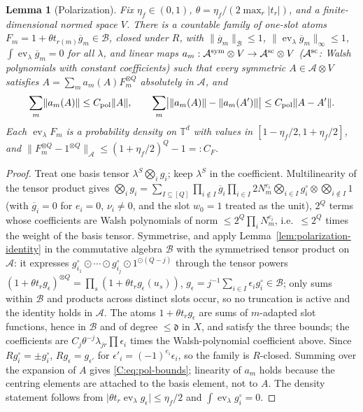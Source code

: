 \documentclass[11pt]{article}
\newtheorem{lemma}[lemma]{Lemma}
\DeclareMathOperator{\ev}{ev}
\newcommand{\Torus}{\mathbb{T}}
\newcommand{\cA}{\mathcal{A}}
\newcommand{\cB}{\mathcal{B}}
\newcommand{\norm}[1]{\lVert #1\rVert}
\newcommand{\abs}[1]{\lvert #1\rvert}
\newcommand{\dg}{\mathfrak{d}}
\begin{document}
\begin{lemma}[Polarization]\label{C:lem:pol}
Fix \(\eta_f\in(0,1)\), \(\theta=\eta_f/(2\max_r\abs{t_r})\), and a
finite-dimensional normed space \(V\).  There is a countable family of
one-slot atoms \(F_m=1+\theta t_{r(m)}\overline g_m\in\cB\), closed under
\(R\), with \(\norm{\overline g_m}_\cB\le1\), \(\norm{\ev_\lambda\overline g_m}_\infty\le1\),
\(\int\ev_\lambda\overline g_m=0\) for all \(\lambda\), and linear maps
\(a_m:\cA^{\rm sym}\otimes V\to\cA^{\rm sc}\otimes V\) (\(\cA^{\rm sc}\): Walsh
polynomials with constant coefficients) such that every symmetric
\(A\in\cA\otimes V\) satisfies \(A=\sum_ma_m(A)F_m^{\otimes Q}\) absolutely in
\(\cA\), and
\begin{equation}
 \sum_m\norm{a_m(A)}\le C_{\rm pol}\norm A,\qquad
 \sum_m\bigl|\norm{a_m(A)}-\norm{a_m(A')}\bigr|\le C_{\rm pol}\norm{A-A'} .
 \label{C:eq:pol-bounds}
\end{equation}
Each \(\ev_\lambda F_m\) is a probability density on \(\Torus^d\) with
values in \([1-\eta_f/2,1+\eta_f/2]\), and
\(\norm{F_m^{\otimes Q}-1^{\otimes Q}}_\cA\le(1+\eta_f/2)^Q-1=:C_F\).
\end{lemma}
\begin{proof}
Treat one basis tensor \(\lambda^S\bigotimes_ig_i\); keep \(\lambda^S\) in
the coefficient.  Multilinearity of the tensor product gives
\(\bigotimes_ig_i=\sum_{I\subseteq[Q]}\prod_{i\notin I}\overline g_i\prod_{i\in I}2N_m^{e_i}
\bigotimes_{i\in I}g^\circ_i\otimes\bigotimes_{i\notin I}1\) (with
\(\overline g_i=0\) for \(e_i=0\), \(\nu_i\ne0\), and the slot \(w_0=1\)
treated as the unit), \(2^Q\) terms whose coefficients are Walsh
polynomials of norm \(\le2^Q\prod_iN_m^{e_i}\), i.e.\ \(\le2^Q\) times the
weight of the basis tensor.  Symmetrise, and apply
Lemma~\ref{lem:polarization-identity} in the commutative algebra \(\cB\) with the
symmetrised tensor product on \(\cA\): it expresses
\(g^\circ_{i_1}\odot\cdots\odot g^\circ_{i_j}\odot1^{\odot(Q-j)}\) through the
tensor powers \((1+\theta t_rg_\epsilon)^{\otimes Q}=\prod_s(1+\theta t_rg_\epsilon(u_s))\),
\(g_\epsilon=j^{-1}\sum_{i\in I}\epsilon_ig^\circ_i\in\cB\); only sums within
\(\cB\) and products across distinct slots occur, so no truncation is
active and the identity holds in \(\cA\).  The atoms \(1+\theta t_rg_\epsilon\)
are sums of \(m\)-adapted slot functions, hence in \(\cB\) and of degree
\(\le\dg\) in \(X\), and satisfy the three bounds; the coefficients are
\(C_j\theta^{-j}\lambda_{jr}\prod\epsilon_i\) times the Walsh-polynomial
coefficient above.  Since \(Rg^\circ_i=\pm g^\circ_i\), \(Rg_\epsilon=g_{\epsilon'}\)
for \(\epsilon'_i=(-1)^{e_i}\epsilon_i\), so the family is \(R\)-closed.
Summing over the expansion of \(A\) gives \eqref{C:eq:pol-bounds};
linearity of \(a_m\) holds because the centring elements are attached to
the basis element, not to \(A\).  The density statement follows from
\(\abs{\theta t_r\ev_\lambda g_\epsilon}\le\eta_f/2\) and \(\int\ev_\lambda g^\circ_i=0\).
\end{proof}
\end{document}
